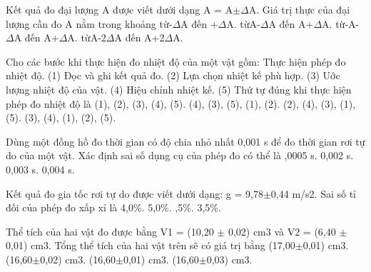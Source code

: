 \begin{ex}
Kết quả đo đại lượng A được viết dưới dạng A = A$\pm$$\Delta$A. Giá trị thực của đại
lượng cần đo A nằm trong khoảng
\choice
{từ-$\Delta$A đến +$\Delta$A.}
{\True từA-$\Delta$A đến A+$\Delta$A.}
{từ-A-$\Delta$A đến A+$\Delta$A.}
{từA-2$\Delta$A đến A+2$\Delta$A.}
\end{ex}

\begin{ex}
Cho các bước khi thực hiện đo nhiệt độ của một vật gồm:
Thực hiện phép đo nhiệt độ.
(1)
Đọc và ghi kết quả đo.
(2)
Lựa chọn nhiệt kế phù hợp.
(3)
Uớc lượng nhiệt độ của vật.
(4)
Hiệu chỉnh nhiệt kế.
(5)
Thứ tự đúng khi thực hiện phép đo nhiệt độ là
\choice
{(1), (2), (3), (4), (5).}
{\True (4), (3), (5), (1), (2).}
{(2), (4), (3), (1), (5).}
{(3), (4), (1), (2), (5).}
\end{ex}

\begin{ex}
Dùng một đồng hồ đo thời gian có độ chia nhỏ nhất 0,001 s để đo thời gian rơi
tự do của một vật. Xác định sai số dụng cụ của phép đo có thể là
\choice
{,0005 s.}
{0,002 s.}
{0,003 s.}
{0,004 s.}
\end{ex}

\begin{ex}
Kết quả đo gia tốc rơi tự do được viết dưới dạng: g = 9,78$\pm$0,44 m/s2. Sai số tỉ
đối của phép đo xấp xỉ là
\choice
{4,0\%.}
{5,0\%.}
{,5\%.}
{3,5\%.}
\end{ex}

\begin{ex}
Thể tích của hai vật đo được bằng V1 = (10,20 $\pm$ 0,02) cm3 và V2 = (6,40 $\pm$
0,01) cm3. Tổng thể tích của hai vật trên sẽ có giá trị bằng
\choice
{(17,00$\pm$0,01) cm3.}
{(16,60$\pm$0,02) cm3.}
{(16,60$\pm$0,01) cm3.}
{\True (16,60$\pm$0,03) cm3.}
\end{ex}


